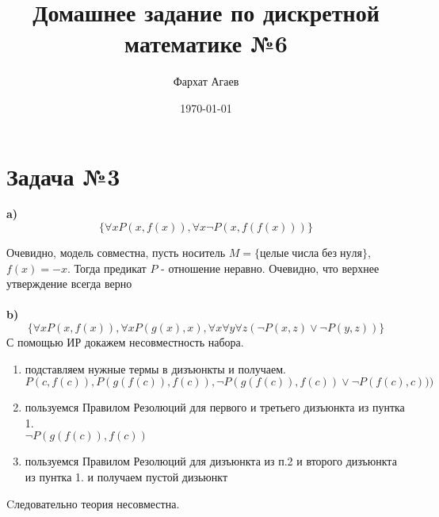 \documentclass[a4paper,12pt]{article} %
\author{Фархат Агаев}
\title{Домашнее задание по дискретной математике №6}
\date{\today}
\begin{document}

\maketitle
\section*{Задача №3}
\textbf{a)}
\[
    \{\forall x P(x, f(x)), \forall x \neg P(x, f(f(x)))\}
\]

Очевидно, модель совместна, пусть носитель $M = \{
    целые \; числа \; без \; нуля\}$, $f(x) = -x $.
    Тогда предикат $P$ - отношение неравно. Очевидно, что верхнее утверждение всегда верно \\ \\
\textbf{b)}
\[\{\forall x P(x, f(x)), \forall x P(g(x), x),
\forall x \forall y \forall z (\neg P(x, z) \vee \neg P(y, z))\}        
\]
С помощью ИР докажем несовместность набора.

\begin{enumerate}
    \item подставляем нужные термы в дизъюнкты и получаем. \\ $P(c, f(c)), P(g(f(c)), f(c)),
    \neg P(g(f(c)), f(c)) \vee \neg P(f(c), c)))$
    \item пользуемся Правилом Резолюций для первого и третьего дизъюнкта из пунтка 1.
    \\ $\neg P(g(f(c)), f(c))$
    \item пользуемся Правилом Резолюций для дизъюнкта из п.2 и второго дизъюнкта из пунтка 1.
    и получаем пустой дизьюнкт 
\end{enumerate}
Cледовательно теория несовместна.
\end{document}
